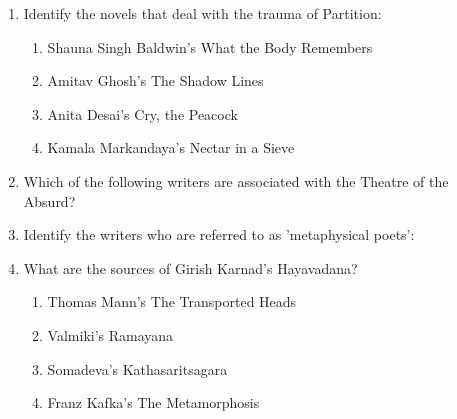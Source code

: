 \documentclass[12pt]{article}
\theoremstyle{remark}
\begin{document}
\begin{enumerate}
\begin{enumerate}
 \end{enumerate}
\hfill{}
\item Identify the novels that deal with the trauma of Partition: 
\begin{enumerate} 
\item Shauna Singh Baldwin's What the Body Remembers 
\item Amitav Ghosh's The Shadow Lines 
\item Anita Desai's Cry, the Peacock 
\item Kamala Markandaya's Nectar in a Sieve 
\end{enumerate}
\hfill{}
\item Which of the following writers are associated with the Theatre of the Absurd? 
\begin{enumerate}  \end{enumerate}
\hfill{}
\item Identify the writers who are referred to as 'metaphysical poets': 
\begin{enumerate}  \end{enumerate}
\hfill{}
\item What are the sources of Girish Karnad's Hayavadana? 
\begin{enumerate} 
\item Thomas Mann's The Transported Heads 
\item Valmiki's Ramayana 
\item Somadeva's Kathasaritsagara 
\item Franz Kafka's The Metamorphosis 
\end{enumerate}

\end{enumerate}
\end{document}
